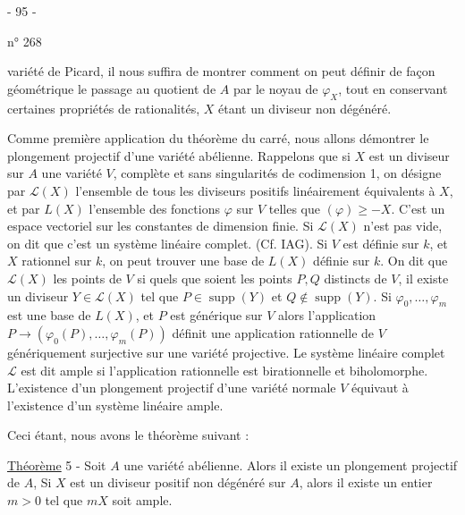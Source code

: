 \begin{center}- 95 -\end{center}
n° 268

variété de Picard, il nous suffira de montrer comment on peut définir de façon géométrique le passage au quotient de $A$ par le noyau de $\varphi_X$, tout en conservant certaines propriétés de rationalités, $X$ étant un diviseur non dégénéré.

Comme première application du théorème du carré, nous allons démontrer le plongement projectif d'une variété abélienne. Rappelons que si $X$ est un diviseur sur $A$ une variété $V$, complète et sans singularités de  codimension 1, on désigne par $\mathcal{L}(X)$ l'ensemble de tous les diviseurs positifs linéairement équivalents à $X$, et par $L(X)$ l'ensemble des fonctions $\varphi$ sur $V$ telles que $(\varphi)\geq-X$. C'est un espace vectoriel sur les constantes de dimension finie. Si $\mathcal{L}(X)$ n'est pas vide, on dit que c'est un système linéaire complet. (Cf. IAG). Si $V$ est définie sur $k$, et $X$ rationnel sur $k$, on peut trouver une base de $L(X)$ définie sur $k$.
On dit que $\mathcal{L}(X)$  les points de $V$ si quels que soient les points $P,Q$ distincts de $V$, il existe un diviseur $Y\in\mathcal{L}(X)$ tel que $P\in\operatorname{supp}(Y)$ et $Q\notin\operatorname{supp}(Y)$. Si $\varphi_0,\ldots,\varphi_m$ est une base de $L(X)$, et $P$ est générique sur $V$ alors l'application $P\longrightarrow(\varphi_0(P),\ldots,\varphi_m(P))$ définit une application rationnelle de $V$ génériquement surjective sur une variété projective. Le système linéaire complet $\mathcal{L}$ est dit ample si l'application rationnelle est birationnelle et biholomorphe. L'existence d'un plongement projectif d'une variété normale $V$ équivaut à l'existence d'un système linéaire ample.

Ceci étant, nous avons le théorème suivant :

\uline{Théorème} 5 - Soit $A$ une variété abélienne. Alors il existe un plongement projectif de $A$, Si $X$ est un diviseur positif non dégénéré sur $A$, alors il existe un entier $m>0$ tel que $mX$ soit ample.
